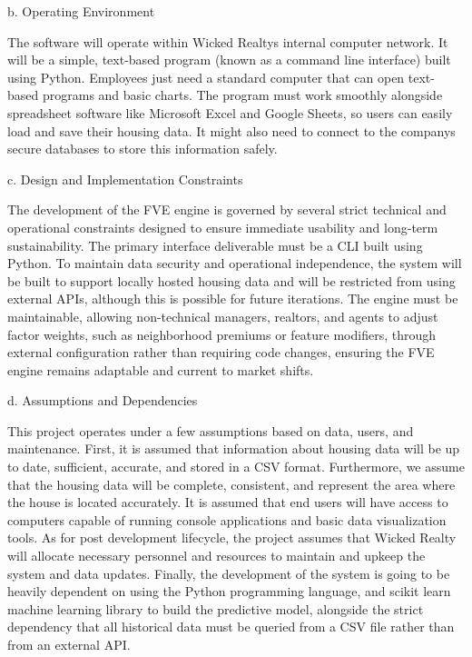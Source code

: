 b. Operating Environment

The software will operate within Wicked Realty\textquotesingle s
internal computer network. It will be a simple, text-based program
(known as a command line interface) built using Python. Employees just
need a standard computer that can open text-based programs and basic
charts. The program must work smoothly alongside spreadsheet software
like Microsoft Excel and Google Sheets, so users can easily load and
save their housing data. It might also need to connect to the
company\textquotesingle s secure databases to store this information
safely.

c. Design and Implementation Constraints

The development of the FVE engine is governed by several strict
technical and operational constraints designed to ensure immediate
usability and long-term sustainability. The primary interface
deliverable must be a CLI built using Python. To maintain data security
and operational independence, the system will be built to support
locally hosted housing data and will be restricted from using external
APIs, although this is possible for future iterations. The engine must
be maintainable, allowing non-technical managers, realtors, and agents
to adjust factor weights, such as neighborhood premiums or feature
modifiers, through external configuration rather than requiring code
changes, ensuring the FVE engine remains adaptable and current to market
shifts.

d. Assumptions and Dependencies

This project operates under a few assumptions based on data, users, and
maintenance. First, it is assumed that information about housing data
will be up to date, sufficient, accurate, and stored in a CSV format.
Furthermore, we assume that the housing data will be complete,
consistent, and represent the area where the house is located
accurately. It is assumed that end users will have access to computers
capable of running console applications and basic data visualization
tools. As for post development lifecycle, the project assumes that
Wicked Realty will allocate necessary personnel and resources to
maintain and upkeep the system and data updates. Finally, the
development of the system is going to be heavily dependent on using the
Python programming language, and scikit learn machine learning library
to build the predictive model, alongside the strict dependency that all
historical data must be queried from a CSV file rather than from an
external API.

